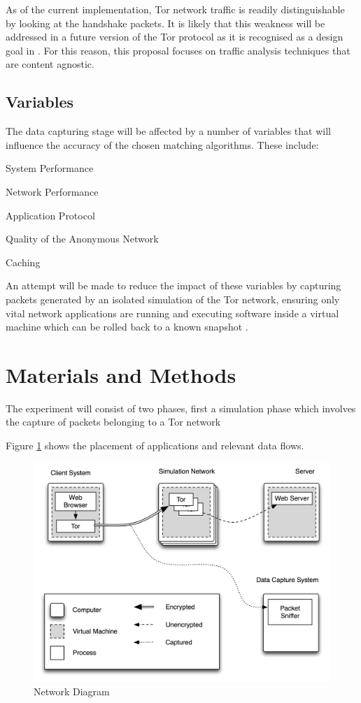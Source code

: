 \documentclass{conference}
\begin{document}
As of the current implementation, Tor network traffic is readily distinguishable by looking at the handshake packets. It is likely that this weakness will be addressed in a future version of the Tor protocol as it is recognised as a design goal in \cite{Dingledine:2008p1542}. For this reason, this proposal focuses on traffic analysis techniques that are content agnostic.

\subsection{Variables}

The data capturing stage will be affected by a number of variables that will influence the accuracy of the chosen matching algorithms. These include:

\begin{enumerate*}
\item System Performance
\item Network Performance
\item Application Protocol
\item Quality of the Anonymous Network
\item Caching
\end{enumerate*}

An attempt will be made to reduce the impact of these variables by capturing packets generated by an isolated simulation of the Tor network, ensuring only vital network applications are running and executing software inside a virtual machine which can be rolled back to a known snapshot \citep{website:snapshot-definition}.

\section{Materials and Methods}

The experiment will consist of two phases, first a simulation phase which involves the capture of packets belonging to a Tor network

Figure \ref{network-diagram} shows the placement of applications and relevant data flows.

\begin{figure}
\center \includegraphics[scale=0.8]{network-diagram}
\caption{Network Diagram}
\label{network-diagram}
\end{figure}


\end{document}
